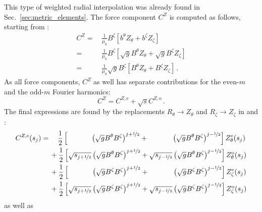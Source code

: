 This type of weighted radial interpolation was already found in Sec.~\ref{sec:metric_elements}.
The force component $C^Z$ is computed as follows, starting from :
\begin{align}
  C^Z =&\, \frac{1}{\mu_0} B^\zeta \left[ b^\theta Z_\theta + b^\zeta Z_\zeta \right] \nonumber \\
      =&\, \frac{1}{\mu_0} B^\zeta \left[ \sqrt{g} B^\theta Z_\theta + \sqrt{g} B^\zeta Z_\zeta \right] \nonumber \\
      =&\, \frac{1}{\mu_0} \sqrt{g} B^\zeta \left[  B^\theta Z_\theta + B^\zeta Z_\zeta \right] \, .
\end{align}
As all force components, $C^Z$ as well has separate contributions for the even-$m$ and the odd-$m$ Fourier harmonics:
\begin{equation}
  C^Z = C^{Z,\mathrm{e}} + \sqrt{s} C^{Z,\mathrm{o}} \, .
\end{equation}
The final expressions are found by the replacements $R_\theta \rightarrow Z_\theta$ and $R_\zeta \rightarrow Z_\zeta$
in  and :
\begin{align}
  C^{Z,\mathrm{e}} (s_j)
  =&\, \phantom{+}~ \frac{1}{2} \left[   \phantom{\sqrt{s_{j+\half}}} \left( \sqrt{g} B^\theta  B^\zeta \right)^{j+\half}
                                       + \phantom{\sqrt{s_{j-\half}}} \left( \sqrt{g} B^\theta  B^\zeta \right)^{j-\half} \right] Z_\theta^\mathrm{e}(s_j) \nonumber \\
  ~&\,          +   \frac{1}{2} \left[            \sqrt{s_{j+\half}}  \left( \sqrt{g} B^\theta  B^\zeta \right)^{j+\half}
                                       +          \sqrt{s_{j-\half}}  \left( \sqrt{g} B^\theta  B^\zeta \right)^{j-\half} \right] Z_\theta^\mathrm{o}(s_j) \nonumber \\
  ~&\,          +   \frac{1}{2} \left[   \phantom{\sqrt{s_{j+\half}}} \left( \sqrt{g}  B^\zeta  B^\zeta \right)^{j+\half}
                                       + \phantom{\sqrt{s_{j-\half}}} \left( \sqrt{g}  B^\zeta  B^\zeta \right)^{j-\half} \right]  Z_\zeta^\mathrm{e}(s_j) \nonumber \\
  ~&\,          +   \frac{1}{2} \left[            \sqrt{s_{j+\half}}  \left( \sqrt{g}  B^\zeta  B^\zeta \right)^{j+\half}
                                       +          \sqrt{s_{j-\half}}  \left( \sqrt{g}  B^\zeta  B^\zeta \right)^{j-\half} \right]  Z_\zeta^\mathrm{o}(s_j) \label{eqn:czmn_e}
\end{align}
as well as
